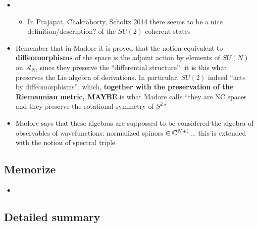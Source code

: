 \documentclass{article}
\begin{document}
\begin{itemize}
\begin{itemize}
        \end{itemize}
    
    \item {}
    
        \begin{itemize}
            
        \item In Prajapat, Chakraborty, Scholtz 2014 there seems to be a nice definition/description? of the $SU(2)$-coherent states
            
        \end{itemize}
    
    \item Remember that in Madore it is proved that the notion equivalent to \textbf{diffeomorphisms} of the space is the adjoint action by elements of $SU(N)$ on $\mathcal A_N$, since they preserve the ``differential structure'': it is this what preserves the Lie algebra of derivations. In particular, $SU(2)$ indeed ``acts by diffeomorphisms'', which, \textbf{together with the preservation of the Riemannian metric, MAYBE} is what Madore calls ``they are NC spaces and they preserve the rotational symmetry of $S^2$''
    
    \item Madore says that these algebras are suppossed to be considered the algebra of observables of wavefunctions: normalized spinors $\in \mathbb{C}^{N+1}$... this is extended with the notion of spectral triple
    
    \end{itemize}

\subsection{Memorize}

    \begin{itemize}

    \item 
    
    \end{itemize}

\subsection{Detailed summary}
\end{document}
